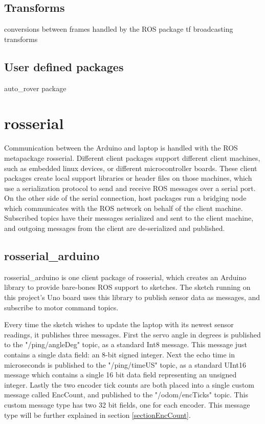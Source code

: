 \subsection{Transforms}
conversions between frames
handled by the ROS package tf
broadcasting transforms


\subsection{User defined packages}
auto\_rover package


\section{rosserial} \label{sectionRosSerial}
Communication between the Arduino and laptop is handled with the ROS metapackage rosserial. Different client packages support different client machines, such as embedded linux devices, or different microcontroller boards. These client packages create local support libraries or header files on those machines, which use a serialization protocol to send and receive ROS messages over a serial port. On the other side of the serial connection, host packages run a bridging node which communicates with the ROS network on behalf of the client machine. Subscribed topics have their messages serialized and sent to the client machine, and outgoing messages from the client are de-serialized and published. 

\subsection{rosserial\_arduino}
rosserial\_arduino is one client package of rosserial, which creates an Arduino library to provide bare-bones ROS support to sketches. The sketch running on this project's Uno board uses this library to publish sensor data as messages, and subscribe to motor command topics.

Every time the sketch wishes to update the laptop with its newest sensor readings, it publishes three messages. First the servo angle in degrees is published to the "/ping/angleDeg" topic, as a standard Int8 message. This message just contains a single data field: an 8-bit signed integer. Next the echo time in microseconds is published to the "/ping/timeUS" topic, as a standard UInt16 message which contains a single 16 bit data field representing an unsigned integer. Lastly the two encoder tick counts are both placed into a single custom message called EncCount, and published to the "/odom/encTicks" topic. This custom message type has two 32 bit fields, one for each encoder. This message type will be further explained in section \ref{sectionEncCount}.


